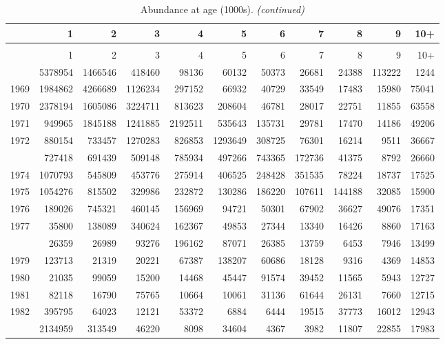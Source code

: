 \documentclass[
]{article}
\begin{document}
\begin{longtable}[t]{lrrrrrrrrrr}
\caption{\label{tab:NAA-table}Abundance at age (1000s).}\\
\toprule
  & 1 & 2 & 3 & 4 & 5 & 6 & 7 & 8 & 9 & 10+\\
\midrule
\endfirsthead
\caption[]{Abundance at age (1000s). \textit{(continued)}}\\
\toprule
  & 1 & 2 & 3 & 4 & 5 & 6 & 7 & 8 & 9 & 10+\\
\midrule
\endhead

\endfoot
\bottomrule
\endlastfoot
1968 & 5378954 & 1466546 & 418460 & 98136 & 60132 & 50373 & 26681 & 24388 & 113222 & 1244\\
1969 & 1984862 & 4266689 & 1126234 & 297152 & 66932 & 40729 & 33549 & 17483 & 15980 & 75041\\
1970 & 2378194 & 1605086 & 3224711 & 813623 & 208604 & 46781 & 28017 & 22751 & 11855 & 63558\\
1971 & 949965 & 1845188 & 1241885 & 2192511 & 535643 & 135731 & 29781 & 17470 & 14186 & 49206\\
1972 & 880154 & 733457 & 1270283 & 826853 & 1293649 & 308725 & 76301 & 16214 & 9511 & 36667\\
\addlinespace
1973 & 727418 & 691439 & 509148 & 785934 & 497266 & 743365 & 172736 & 41375 & 8792 & 26660\\
1974 & 1070793 & 545809 & 453776 & 275914 & 406525 & 248428 & 351535 & 78224 & 18737 & 17525\\
1975 & 1054276 & 815502 & 329986 & 232872 & 130286 & 186220 & 107611 & 144188 & 32085 & 15900\\
1976 & 189026 & 745321 & 460145 & 156969 & 94721 & 50301 & 67902 & 36627 & 49076 & 17351\\
1977 & 35800 & 138089 & 340624 & 162367 & 49853 & 27344 & 13340 & 16426 & 8860 & 17163\\
\addlinespace
1978 & 26359 & 26989 & 93276 & 196162 & 87071 & 26385 & 13759 & 6453 & 7946 & 13499\\
1979 & 123713 & 21319 & 20221 & 67387 & 138207 & 60686 & 18128 & 9316 & 4369 & 14853\\
1980 & 21035 & 99059 & 15200 & 14468 & 45447 & 91574 & 39452 & 11565 & 5943 & 12727\\
1981 & 82118 & 16790 & 75765 & 10664 & 10061 & 31136 & 61644 & 26131 & 7660 & 12715\\
1982 & 395795 & 64023 & 12121 & 53372 & 6884 & 6444 & 19515 & 37773 & 16012 & 12943\\
\addlinespace
1983 & 2134959 & 313549 & 46220 & 8098 & 34604 & 4367 & 3982 & 11807 & 22855 & 17983\\

\end{longtable}
\end{document}
